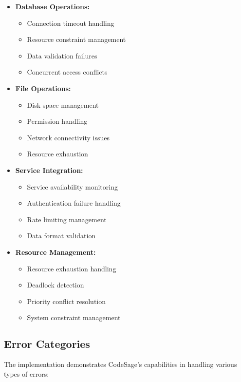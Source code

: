 \begin{itemize}
    \item \textbf{Database Operations:}
    \begin{itemize}
        \item Connection timeout handling
        \item Resource constraint management
        \item Data validation failures
        \item Concurrent access conflicts
    \end{itemize}
    
    \item \textbf{File Operations:}
    \begin{itemize}
        \item Disk space management
        \item Permission handling
        \item Network connectivity issues
        \item Resource exhaustion
    \end{itemize}
    
    \item \textbf{Service Integration:}
    \begin{itemize}
        \item Service availability monitoring
        \item Authentication failure handling
        \item Rate limiting management
        \item Data format validation
    \end{itemize}
    
    \item \textbf{Resource Management:}
    \begin{itemize}
        \item Resource exhaustion handling
        \item Deadlock detection
        \item Priority conflict resolution
        \item System constraint management
    \end{itemize}
\end{itemize}

\subsection{Error Categories}
The implementation demonstrates CodeSage's capabilities in handling various types of errors:

